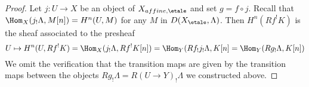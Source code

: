 \begin{proof}
Let $j : U \to X$ be an object of $X_{affine, \etale}$ and set $g = f \circ j$.
Recall that $\Hom_X(j_!\Lambda, M[n]) = H^n(U, M)$ for any $M$ in
$D(X_\etale, \Lambda)$. Then $H^n(Rf^!K)$ is the sheaf associated to the
presheaf
$$
U \mapsto H^n(U, Rf^!K) = \Hom_X(j_!\Lambda, Rf^!K[n]) =
\Hom_Y(Rf_!j_!\Lambda, K[n] = \Hom_Y(Rg_!\Lambda, K[n])
$$
We omit the verification that the transition maps are given by the transition
maps between the objects $Rg_!\Lambda = R(U \to Y)_!\Lambda$ we constructed
above.
\end{proof}






















